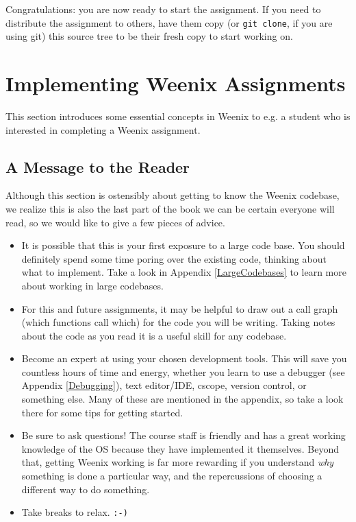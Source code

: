 Congratulations: you are now ready to start the assignment.  If you need to distribute the assignment to others, have them copy (or \texttt{git clone}, if you are using git) this source tree to be their fresh copy to start working on.

\section{Implementing Weenix Assignments}

This section introduces some essential concepts in Weenix to e.g. a student who is interested in completing a Weenix assignment.

\subsection{A Message to the Reader}
Although this section is ostensibly about getting to know the Weenix codebase, we realize this is also the last part of the book we can be certain everyone will read, so we would like to give a few pieces of advice.

\begin{itemize}
    \item It is possible that this is your first exposure to a large code base. You should definitely spend some time poring over the existing code, thinking about what to implement. Take a look in Appendix \ref{LargeCodebases} to learn more about working in large codebases.
    \item For this and future assignments, it may be helpful to draw out a call graph (which functions call which) for the code you will be writing. Taking notes about the code as you read it is a useful skill for any codebase.
    \item Become an expert at using your chosen development tools. This will save you countless hours of time and energy, whether you learn to use a debugger (see Appendix \ref{Debugging}), text editor/IDE, cscope, version control, or something else. Many of these are mentioned in the appendix, so take a look there for some tips for getting started.
    \item Be sure to ask questions! The course staff is friendly and has a great working knowledge of the OS because they have implemented it themselves. Beyond that, getting Weenix working is far more rewarding if you understand \emph{why} something is done a particular way, and the repercussions of choosing a different way to do something.
    \item Take breaks to relax. \texttt{:-)}
\end{itemize}

